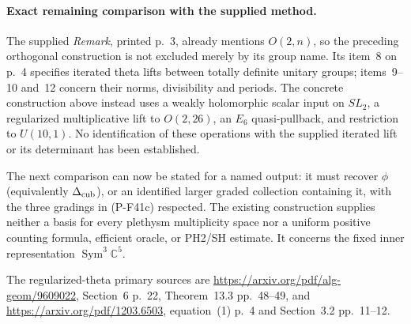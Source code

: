 \paragraph{Exact remaining comparison with the supplied method.}
The supplied \emph{Remark}, printed p.~3, already mentions
$O(2,n)$, so the preceding orthogonal construction is not
excluded merely by its group name. Its item~8 on p.~4
specifies iterated theta lifts between totally definite
unitary groups; items~9--10 and~12 concern their norms,
divisibility and periods. The concrete construction above
instead uses a weakly holomorphic scalar input on $SL_2$,
a regularized multiplicative lift to $O(2,26)$, an $E_6$
quasi-pullback, and restriction to $U(10,1)$.
No identification of these operations with the supplied
iterated lift or its determinant has been established.

The next comparison can now be stated for a named output:
it must recover $\phi$ (equivalently $\Delta_{\rm cub}$),
or an identified larger graded collection containing it,
with the three gradings in (P-F41c) respected.
The existing construction supplies neither a basis for
every plethysm multiplicity space nor a uniform positive
counting formula, efficient oracle, or PH2/SH estimate.
It concerns the fixed inner representation
$\operatorname{Sym}^3\mathbb C^5$.

The regularized-theta primary sources are
\url{https://arxiv.org/pdf/alg-geom/9609022}, Section~6 p.~22,
Theorem~13.3 pp.~48--49, and
\url{https://arxiv.org/pdf/1203.6503}, equation~(1) p.~4
and Section~3.2 pp.~11--12.
